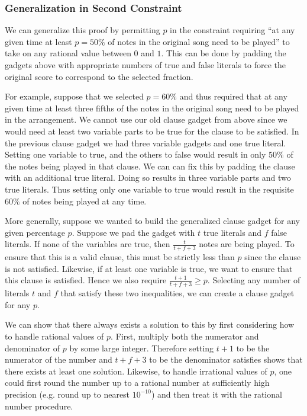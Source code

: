 \documentclass[11pt,letterpaper]{article}
\begin{document}
\subsubsection{Generalization in Second Constraint}
We can generalize this proof by permitting $p$ in the constraint requiring ``at any given time at least $p=50\%$ of notes in the original song need to be played'' to take on any rational value between $0$ and $1$. This can be done by padding the gadgets above with appropriate numbers of true and false literals to force the original score to correspond to the selected fraction.

For example, suppose that we selected $p=60\%$ and thus required that at any given time at least three fifths of the notes in the original song need to be played in the arrangement. We cannot use our old clause gadget from above since we would need at least two variable parts to be true for the clause to be satisfied. In the previous clause gadget we had three variable gadgets and one true literal. Setting one variable to true, and the others to false would result in only $50\%$ of the notes being played in that clause. We can can fix this by padding the clause with an additional true literal. Doing so results in three variable parts and two true literals. Thus setting only one variable to true would result in the requisite $60\%$ of notes being played at any time.

More generally, suppose we wanted to build the generalized clause gadget for any given percentage $p$. Suppose we pad the gadget with $t$ true literals and $f$ false literals. If none of the variables are true, then $\frac{t}{t+f+3}$ notes are being played. To ensure that this is a valid clause, this must be strictly less than $p$ since the clause is not satisfied. Likewise, if at least one variable is true, we want to ensure that this clause is satisfied. Hence we also require $\frac{t+1}{t+f+3}\ge p$. Selecting any number of literals $t$ and $f$ that satisfy these two inequalities, we can create a clause gadget for any $p$.

We can show that there always exists a solution to this by first considering how to handle rational values of $p$. First, multiply both the numerator and denominator of $p$ by some large integer. Therefore setting $t+1$ to be the numerator of the number and $t+f+3$ to be the denominator satisfies shows that there exists at least one solution. Likewise, to handle irrational values of $p$, one could first round the number up to a rational number at sufficiently high precision (e.g. round up to nearest $10^{-10}$) and then treat it with the rational number procedure.
\end{document}
